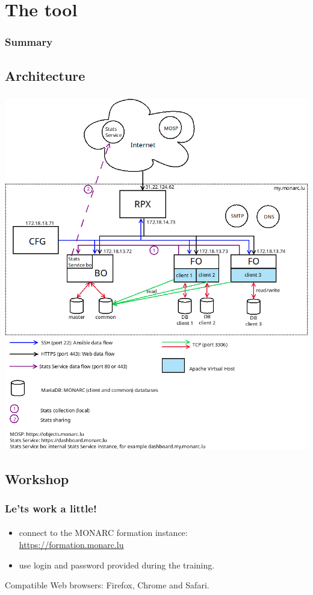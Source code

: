 %
%
\section{The tool}
\begin{frame}
  \frametitle{Summary}
\end{frame}
\subsection{Architecture}
\begin{frame}
  \frametitle{}
  \framesubtitle{}
  \begin{center}
    \includegraphics[scale=0.25]{pictures/monarc-architecture.png}
  \end{center}
\end{frame}



\subsection{Workshop}
\begin{frame}
  \frametitle{Le'ts work a little!}
  \framesubtitle{}
  \begin{itemize}
    \item connect to the MONARC formation instance:\\
          \url{https://formation.monarc.lu}
    \item use login and password provided during the training.
  \end{itemize}

  \bigskip
  Compatible Web browsers: Firefox, Chrome and Safari.
\end{frame}



